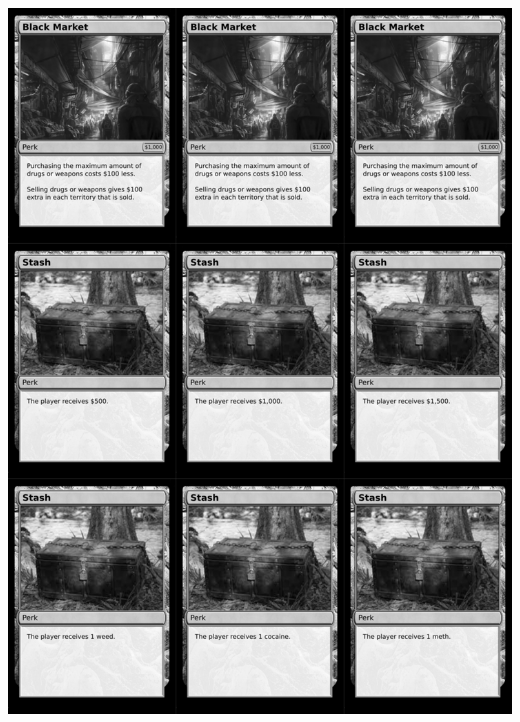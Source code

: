 \documentclass[a4paper]{article}
\begin{document}
\newpage

\begin{center}
	\centering
	\includegraphics[width=200.5mm,height=280.7mm]{output/temp/page29.png}
\end{center}
\end{document}
